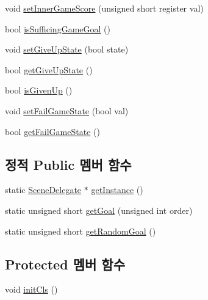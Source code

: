 \begin{DoxyCompactItemize}
\item 
void \hyperlink{classhsh_1_1_code_lady_j_j_y_1_1game2048_1_1_scene_delegate_abd34ec6afe537cccfd469f2e1fc090fc}{set\+Inner\+Game\+Score} (unsigned short register val)
\item 
bool \hyperlink{classhsh_1_1_code_lady_j_j_y_1_1game2048_1_1_scene_delegate_a590a3df7299ee2118db8556d7d594460}{is\+Sufficing\+Game\+Goal} ()
\item 
void \hyperlink{classhsh_1_1_code_lady_j_j_y_1_1game2048_1_1_scene_delegate_a26d362200e9644c85f892e71592eef92}{set\+Give\+Up\+State} (bool state)
\item 
bool \hyperlink{classhsh_1_1_code_lady_j_j_y_1_1game2048_1_1_scene_delegate_abe91b73b30ea51884c07d50f4a9664f3}{get\+Give\+Up\+State} ()
\item 
bool \hyperlink{classhsh_1_1_code_lady_j_j_y_1_1game2048_1_1_scene_delegate_a66c164970bd5d826ca85deaeea30167b}{is\+Given\+Up} ()
\item 
void \hyperlink{classhsh_1_1_code_lady_j_j_y_1_1game2048_1_1_scene_delegate_adc205b068a4df3da173c37d4236a4e25}{set\+Fail\+Game\+State} (bool val)
\item 
bool \hyperlink{classhsh_1_1_code_lady_j_j_y_1_1game2048_1_1_scene_delegate_ab975ebc9c59b2e9da24e957a7bd2d2ac}{get\+Fail\+Game\+State} ()
\end{DoxyCompactItemize}
\subsection*{정적 Public 멤버 함수}
\begin{DoxyCompactItemize}
\item 
static \hyperlink{classhsh_1_1_code_lady_j_j_y_1_1game2048_1_1_scene_delegate}{Scene\+Delegate} $\ast$ \hyperlink{classhsh_1_1_code_lady_j_j_y_1_1game2048_1_1_scene_delegate_a332a574da455fb687b5d283399a6976c}{get\+Instance} ()
\item 
static unsigned short \hyperlink{classhsh_1_1_code_lady_j_j_y_1_1game2048_1_1_scene_delegate_a4b1f64a13b6816a657bc21bdc6a17c61}{get\+Goal} (unsigned int order)
\item 
static unsigned short \hyperlink{classhsh_1_1_code_lady_j_j_y_1_1game2048_1_1_scene_delegate_abb107cf268a50b3ebd9bd545c88a9a35}{get\+Random\+Goal} ()
\end{DoxyCompactItemize}
\subsection*{Protected 멤버 함수}
\begin{DoxyCompactItemize}
\item 
void \hyperlink{classhsh_1_1_code_lady_j_j_y_1_1game2048_1_1_scene_delegate_ab5504cff24fa2c916c0c6139aff67a4e}{init\+Cls} ()
\end{DoxyCompactItemize}
